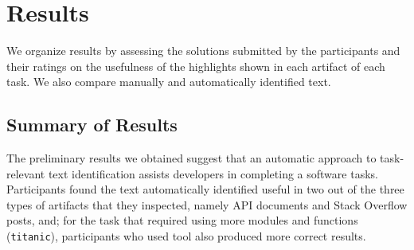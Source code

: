 
\section{Results}
\label{cp6:results}

We organize results by assessing the solutions submitted by the participants
and their ratings on the usefulness of the highlights shown 
in each artifact of each task. We also compare manually and automatically identified text.









\subsection{Summary of Results}


The preliminary results we obtained suggest that 
an automatic approach to task-relevant text identification
assists 
developers in completing a software tasks. 
Participants found the text automatically identified
useful in two out of the three types of artifacts that they inspected, 
namely API documents and Stack Overflow posts, and; 
for the task that required using more modules and functions (\texttt{titanic}),
participants who used \acs{tool} also produced more correct results.




